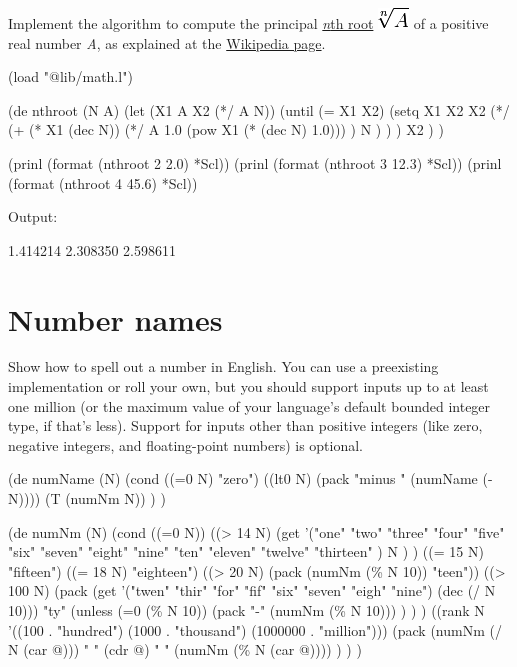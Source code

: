 Implement the algorithm to compute the principal
\href{http://en.wikipedia.org/wiki/Nth\_root}{\emph{n}th root}
\includegraphics[scale=.6]{graphics/4518ae089727239af6a569824b9b86e2.png}
of a positive real number \emph{A}, as explained at the
\href{http://en.wikipedia.org/wiki/Nth\_root\_algorithm}{Wikipedia
page}.

\begin{wideverbatim}

(load "@lib/math.l")

(de nthroot (N A)
   (let (X1 A  X2 (*/ A N))
      (until (= X1 X2)
         (setq
            X1 X2
            X2 (*/
               (+
                  (* X1 (dec N))
                  (*/ A 1.0 (pow X1 (* (dec N) 1.0))) )
               N ) ) )
      X2 ) )

(prinl (format (nthroot 2  2.0) *Scl))
(prinl (format (nthroot 3 12.3) *Scl))
(prinl (format (nthroot 4 45.6) *Scl))

Output:

1.414214
2.308350
2.598611

\end{wideverbatim}

\pagebreak{}
\section*{Number names}

Show how to spell out a number in English. You can use a preexisting
implementation or roll your own, but you should support inputs up to at
least one million (or the maximum value of your language's default
bounded integer type, if that's less). Support for inputs other than
positive integers (like zero, negative integers, and floating-point
numbers) is optional.


\begin{wideverbatim}

(de numName (N)
   (cond
      ((=0 N) "zero")
      ((lt0 N) (pack "minus " (numName (- N))))
      (T (numNm N)) ) )


(de numNm (N)
   (cond
      ((=0 N))
      ((> 14 N)
         (get '("one" "two" "three" "four" "five" "six" "seven" "eight"
                  "nine" "ten" "eleven" "twelve" "thirteen" ) N ) )
      ((= 15 N) "fifteen")
      ((= 18 N) "eighteen")
      ((> 20 N) (pack (numNm (\% N 10)) "teen"))
      ((> 100 N)
         (pack
            (get '("twen" "thir" "for" "fif" "six" "seven" "eigh" "nine") (dec (/ N 10)))
            "ty"
            (unless (=0 (\% N 10))
               (pack "-" (numNm (\% N 10))) ) ) )
      ((rank N '((100 . "hundred") (1000 . "thousand") (1000000 . "million")))
         (pack (numNm (/ N (car @))) " " (cdr @) " " (numNm (\% N (car @)))) ) ) )

\end{wideverbatim}

